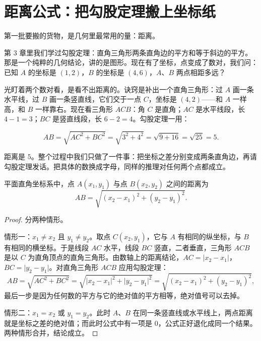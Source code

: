 \section{距离公式：把勾股定理搬上坐标纸}

第一批要搬的货物，是几何里最常用的量：距离。

第 3 章里我们学过勾股定理：直角三角形两条直角边的平方和等于斜边的平方。那是一个纯粹的几何结论，讲的是图形。现在有了坐标，点变成了数对，我们问：已知 $A$ 的坐标是 $(1,2)$，$B$ 的坐标是 $(4,6)$，$A$、$B$ 两点相距多远？

光盯着两个数对看，是看不出距离的。诀窍是补出一个直角三角形：过 $A$ 画一条水平线，过 $B$ 画一条竖直线，它们交于一点 $C$，坐标是 $(4,2)$——和 $A$ 一样高，和 $B$ 一样靠右。现在看三角形 $ACB$：角 $C$ 是直角；$AC$ 是水平线段，长 $4-1=3$；$BC$ 是竖直线段，长 $6-2=4$。勾股定理一用：

\[
AB=\sqrt{AC^{2}+BC^{2}}=\sqrt{3^{2}+4^{2}}=\sqrt{9+16}=\sqrt{25}=5.
\]

距离是 $5$。整个过程中我们只做了一件事：把坐标之差分别变成两条直角边，再请勾股定理发话。把具体的数换成字母，同样的推理对任何两个点都成立。

\begin{dingli}[两点间的距离公式]
平面直角坐标系中，点 $A(x_{1},y_{1})$ 与点 $B(x_{2},y_{2})$ 之间的距离为
\[
AB=\sqrt{(x_{2}-x_{1})^{2}+(y_{2}-y_{1})^{2}}.
\]
\end{dingli}

\begin{proof}
分两种情形。

情形一：$x_{1}\ne x_{2}$ 且 $y_{1}\ne y_{2}$。取点 $C(x_{2},y_{1})$，它与 $A$ 有相同的纵坐标，与 $B$ 有相同的横坐标。于是线段 $AC$ 水平，线段 $BC$ 竖直，二者垂直，三角形 $ACB$ 是以 $C$ 为直角顶点的直角三角形。由数轴上的距离结论，$AC=\lvert x_{2}-x_{1}\rvert$，$BC=\lvert y_{2}-y_{1}\rvert$。对直角三角形 $ACB$ 应用勾股定理：
\[
AB=\sqrt{AC^{2}+BC^{2}}=\sqrt{\lvert x_{2}-x_{1}\rvert^{2}+\lvert y_{2}-y_{1}\rvert^{2}}
=\sqrt{(x_{2}-x_{1})^{2}+(y_{2}-y_{1})^{2}},
\]
最后一步是因为任何数的平方与它的绝对值的平方相等，绝对值号可以去掉。

情形二：$x_{1}=x_{2}$ 或 $y_{1}=y_{2}$。此时 $A$、$B$ 在同一条竖直线或水平线上，两点距离就是坐标之差的绝对值；而此时公式中有一项是 $0$，公式正好退化成同一个结果。两种情形合并，结论成立。
\end{proof}

\begin{center}
\end{center}

